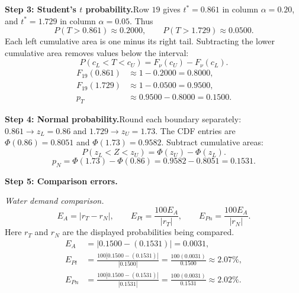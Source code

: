 \begin{enumerate}[leftmargin=*,label=\textbf{\arabic*.},itemsep=12pt,parsep=3pt,topsep=5pt]
\begin{minipage}{\linewidth}
\end{minipage}\par
\par\noindent\begin{minipage}{\linewidth}
\par\textbf{Step 3: Student's $t$ probability.}\nopagebreak\enspace Row $19$ gives $t^*=0.861$ in column $\alpha=0.20$, and $t^*=1.729$ in column $\alpha=0.05$. Thus
\[
P(T>0.861)\approx0.2000,\qquad P(T>1.729)\approx0.0500.
\]
Each left cumulative area is one minus its right tail. Subtracting the lower cumulative area removes values below the interval:
\[
P(c_L<T<c_U)=F_\nu(c_U)-F_\nu(c_L).
\]
\[
\begin{aligned}F_{19}(0.861)&\approx1-0.2000=0.8000,\\F_{19}(1.729)&\approx1-0.0500=0.9500,\\p_T&\approx0.9500-0.8000=\boxed{0.1500}.\end{aligned}
\]

\end{minipage}\par
\par\textbf{Step 4: Normal probability.}\nopagebreak\enspace Round each boundary separately: $0.861\to z_L=0.86$ and $1.729\to z_U=1.73$. The CDF entries are $\Phi(0.86)=0.8051$ and $\Phi(1.73)=0.9582$. Subtract cumulative areas:
\[
P(z_L<Z<z_U)=\Phi(z_U)-\Phi(z_L).
\]
\[
p_N=\Phi(1.73)-\Phi(0.86)=0.9582-0.8051=\boxed{0.1531}.
\]

\par\textbf{Step 5: Comparison errors.}\nopagebreak\enspace \par\noindent\begin{minipage}{\linewidth}
\par\textit{Water demand comparison.}
\[
E_A=|r_T-r_N|,\qquad E_{Pt}=\frac{100E_A}{|r_T|},\qquad E_{Pn}=\frac{100E_A}{|r_N|}.
\]
Here $r_T$ and $r_N$ are the displayed probabilities being compared.
\[
\begin{aligned}
E_A&=|0.1500-(0.1531)|=0.0031,\\
E_{Pt}&=\frac{100|0.1500-(0.1531)|}{|0.1500|}=\frac{100(0.0031)}{0.1500}\approx 2.07\%,\\
E_{Pn}&=\frac{100|0.1500-(0.1531)|}{|0.1531|}=\frac{100(0.0031)}{0.1531}\approx 2.02\%.
\end{aligned}
\]
\end{minipage}\par


\end{enumerate}

